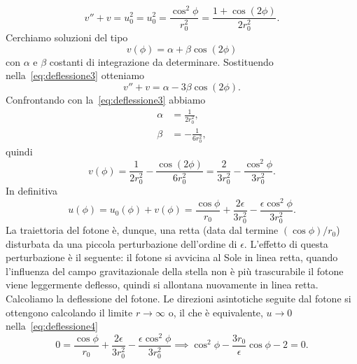 \begin{equation}
  \label{eq:deflessione3}
  v'' + v = u_{0}^{2} = u_{0}^{2} = \frac{\cos^{2}\phi}{r_{0}^{2}} = \frac{1 +
    \cos(2\phi)}{2r_{0}^{2}}.
\end{equation}
Cerchiamo soluzioni del tipo
\begin{equation}
  v(\phi) = \alpha + \beta\cos(2\phi)
\end{equation}
con $\alpha$ e $\beta$ costanti di integrazione da determinare.  Sostituendo
nella~\eqref{eq:deflessione3} otteniamo
\begin{equation}
  v'' + v = \alpha - 3\beta\cos(2\phi).
\end{equation}
Confrontando con la~\eqref{eq:deflessione3} abbiamo
\begin{subequations}
  \begin{align}
    \alpha &= \frac{1}{2r_{0}^{2}}, \\
    \beta &= - \frac{1}{6r_{0}^{2}},
  \end{align}
\end{subequations}
quindi
\begin{equation}
  v(\phi) = \frac{1}{2r_{0}^{2}} - \frac{\cos(2\phi)}{6r_{0}^{2}} =
  \frac{2}{3r_{0}^{2}} - \frac{\cos^{2}\phi}{3r_{0}^{2}}.
\end{equation}
In definitiva
\begin{equation}
  \label{eq:deflessione4}
  u(\phi) = u_{0}(\phi) + v(\phi) = \frac{\cos\phi}{r_{0}} +
  \frac{2\epsilon}{3r_{0}^{2}} - \frac{\epsilon\cos^{2}\phi}{3r_{0}^{2}}.
\end{equation}
La traiettoria del fotone è, dunque, una retta (data dal termine
$(\cos\phi)/r_{0}$) disturbata da una piccola perturbazione dell'ordine di
$\epsilon$.  L'effetto di questa perturbazione è il seguente: il fotone si
avvicina al Sole in linea retta, quando l'influenza del campo gravitazionale
della stella non è più trascurabile il fotone viene leggermente deflesso, quindi
si allontana nuovamente in linea retta.  Calcoliamo la deflessione del fotone.
Le direzioni asintotiche seguite dal fotone si ottengono calcolando il limite
$r \to \infty$ o, il che è equivalente, $u \to 0$ nella~\eqref{eq:deflessione4}
\begin{equation}
  0 = \frac{\cos\phi}{r_{0}} + \frac{2\epsilon}{3r_{0}^{2}} -
  \frac{\epsilon\cos^{2}\phi}{3r_{0}^{2}} \implies \cos^{2}\phi -
  \frac{3r_{0}}{\epsilon}\cos\phi - 2 = 0.
\end{equation}
